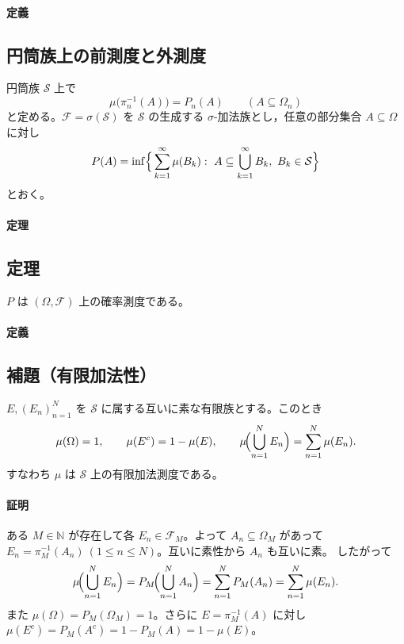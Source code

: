 \documentclass[uplatex,dvipdfmx,11pt,a4paper,openany]{bxjsbook}
\begin{document}
\paragraph{定義}
\subsection{円筒族上の前測度と外測度}
円筒族 \(\mathcal{S}\) 上で
                    \[\mu\bigl(\pi_n^{-1}(A)\bigr) = P_n(A)\qquad (A\subseteq \Omega_n)\]
                    と定める。\(\mathcal{F} = \sigma(\mathcal{S})\) を \(\mathcal{S}\) の生成する \(\sigma\)-加法族とし，任意の部分集合 \(A\subseteq\Omega\) に対し
                    \[P(A) = \inf\Bigl\{\,\sum_{k=1}^{\infty} \mu(B_k):\ A\subseteq \bigcup_{k=1}^{\infty} B_k,\ B_k\in\mathcal{S}\Bigr\}\]
                    とおく。


\paragraph{定理}
\subsection{定理}
\(P\) は \((\Omega,\mathcal{F})\) 上の確率測度である。


\paragraph{定義}
\subsection{補題（有限加法性）}
\(E,(E_n)_{n=1}^N\) を \(\mathcal{S}\) に属する互いに素な有限族とする。このとき
                    \[\mu(\Omega)=1,\qquad \mu(E^c)=1-\mu(E),\qquad \mu\!\Bigl(\bigcup_{n=1}^N E_n\Bigr)=\sum_{n=1}^N \mu(E_n).\]
                    すなわち \(\mu\) は \(\mathcal{S}\) 上の有限加法測度である。

\paragraph{証明}
ある \(M\in\mathbb{N}\) が存在して各 \(E_n\in\mathcal{F}_M\)。よって \(A_n\subseteq\Omega_M\) があって
                        \(E_n=\pi_M^{-1}(A_n)\ (1\le n\le N)\)。互いに素性から \(A_n\) も互いに素。
                        したがって
                        \[\mu\!\Bigl(\bigcup_{n=1}^N E_n\Bigr)=P_M\!\Bigl(\bigcup_{n=1}^N A_n\Bigr)=\sum_{n=1}^N P_M(A_n)=\sum_{n=1}^N \mu(E_n).\]
                        また \(\mu(\Omega)=P_M(\Omega_M)=1\)。さらに \(E=\pi_M^{-1}(A)\) に対し \(\mu(E^c)=P_M(A^c)=1-P_M(A)=1-\mu(E)\)。
\end{document}
